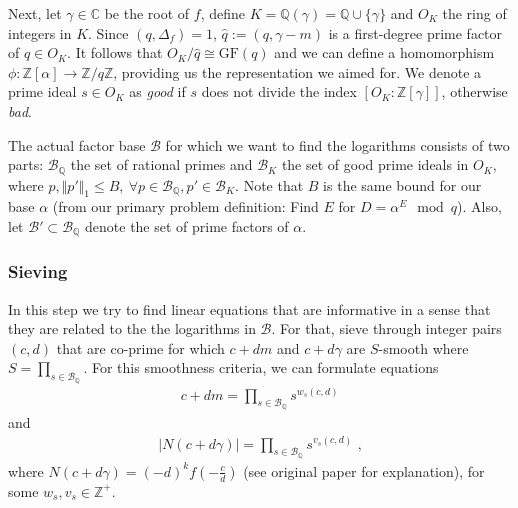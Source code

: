 \documentclass[paper=a4, fontsize=11pt]{scrartcl} %
\numberwithin{equation}{section} %
\numberwithin{figure}{section} %
\numberwithin{table}{section} %
\begin{document}
Next, let $\gamma\in\mathbb{C}$ be the root of $f$, define $K = \mathbb{Q}(\gamma) = \mathbb{Q}\cup\{\gamma\}$ and $O_K$ the ring of integers in $K$. Since $(q,\Delta_f) = 1$, $\hat{q}:=(q,\gamma-m)$ is a first-degree prime factor of $q\in O_K$. It follows that $O_K/\hat{q}\cong\mathrm{GF}(q)$ and we can define a homomorphism $\phi:\mathbb{Z}[\alpha]\rightarrow\mathbb{Z}/q\mathbb{Z}$, providing us the representation we aimed for. We denote a prime ideal $s\in O_K$ as \textit{good} if $s$ does not divide the index $[O_K:\mathbb{Z}[\gamma]]$, otherwise \textit{bad}.

The actual factor base $\mathcal{B}$ for which we want to find the logarithms consists of two parts: $\mathcal{B}_\mathbb{Q}$ the set of rational primes and $\mathcal{B}_K$ the set of good prime ideals in $O_K$, where $p,\Vert p'\Vert_1\leq B,\ \forall p\in\mathcal{B}_\mathbb{Q},p'\in\mathcal{B}_K$. Note that $B$ is the same bound for our base $\alpha$ (from our primary problem definition: Find $E$ for $D=\alpha^E\mod q$). Also, let $\mathcal{B}'\subset\mathcal{B}_\mathbb{Q}$ denote the set of prime factors of $\alpha$.

\subsubsection{Sieving}
In this step we try to find linear equations that are informative in a sense that they are related to the the logarithms in $\mathcal{B}$. For that, sieve through integer pairs $(c,d)$ that are co-prime for which $c+dm$ and $c+d\gamma$ are $S$-smooth where $S = \prod_{s\in\mathcal{B}_\mathbb{Q}}$. For this smoothness criteria, we can formulate equations
\begin{eqnarray}
c+dm = \prod_{s\in\mathcal{B}_\mathbb{Q}}s^{w_s(c,d)}
\end{eqnarray}
and
\begin{eqnarray}
|N(c+d\gamma)| = \prod_{s\in\mathcal{B}_\mathbb{Q}}s^{v_s(c,d)}
\text{ ,}
\end{eqnarray}
where $N(c+d\gamma) = (-d)^kf(-\frac{c}{d})$ (see original paper \citep{gordon1993discrete} for explanation), for some $w_s,v_s\in\mathbb{Z}^+$.
\end{document}
